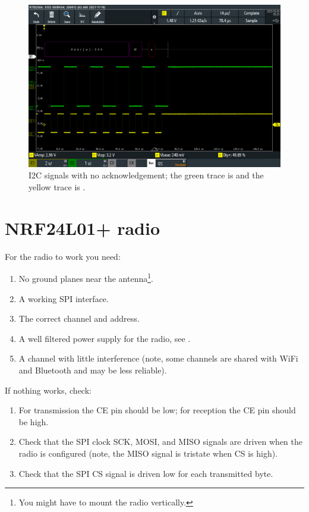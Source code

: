 \begin{enumerate}
\begin{figure}[!h]
  \centering
  \includegraphics[width=\linewidth]{figs/i2c-noack.png}
  \caption{I2C signals with no acknowledgement; the green trace is
   and the yellow trace is .}
  \label{fig:i2c-noack}
\end{figure}


\section{NRF24L01+ radio}
\label{nrf24l01-radio}

For the radio to work you need:

\begin{enumerate}
\item No ground planes near the antenna\footnote{You might have to
  mount the radio vertically.}.

\item A working SPI interface.

\item The correct channel and address.

\item A well filtered power supply for the radio, see .

\item A channel with little interference (note, some channels are
  shared with WiFi and Bluetooth and may be less reliable).
\end{enumerate}

If nothing works, check:

\begin{enumerate}
\item
  For transmission the CE pin should be low; for reception the CE pin
  should be high.
\item
  Check that the SPI clock SCK, MOSI, and MISO signals are driven when
  the radio is configured (note, the MISO signal is tristate when CS is
  high).
\item
  Check that the SPI CS signal is driven low for each transmitted byte.
\end{enumerate}


\end{enumerate}
